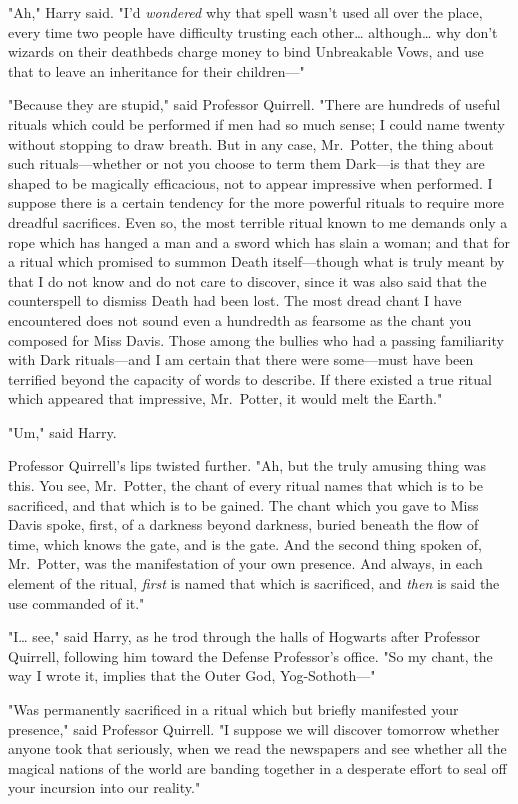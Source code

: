 "Ah," Harry said. "I'd \emph{wondered} why that spell wasn't used all over the
place, every time two people have difficulty trusting each other{\ldots}
although{\ldots} why don't wizards on their deathbeds charge money to bind
Unbreakable Vows, and use that to leave an inheritance for their children---"

"Because they are stupid," said Professor Quirrell. "There are hundreds of
useful rituals which could be performed if men had so much sense; I could name
twenty without stopping to draw breath. But in any case, Mr.~Potter, the thing
about such rituals---whether or not you choose to term them Dark---is that they
are shaped to be magically efficacious, not to appear impressive when
performed. I suppose there is a certain tendency for the more powerful rituals
to require more dreadful sacrifices. Even so, the most terrible ritual known to
me demands only a rope which has hanged a man and a sword which has slain a
woman; and that for a ritual which promised to summon Death itself---though
what is truly meant by that I do not know and do not care to discover, since it
was also said that the counterspell to dismiss Death had been lost. The most
dread chant I have encountered does not sound even a hundredth as fearsome as
the chant you composed for Miss Davis. Those among the bullies who had a
passing familiarity with Dark rituals---and I am certain that there were
some---must have been terrified beyond the capacity of words to describe. If
there existed a true ritual which appeared that impressive, Mr.~Potter, it
would melt the Earth."

"Um," said Harry.

Professor Quirrell's lips twisted further. "Ah, but the truly amusing thing was
this. You see, Mr.~Potter, the chant of every ritual names that which is to be
sacrificed, and that which is to be gained. The chant which you gave to Miss
Davis spoke, first, of a darkness beyond darkness, buried beneath the flow of
time, which knows the gate, and is the gate. And the second thing spoken of,
Mr.~Potter, was the manifestation of your own presence. And always, in each
element of the ritual, \emph{first} is named that which is sacrificed, and
\emph{then} is said the use commanded of it."

"I{\ldots} see," said Harry, as he trod through the halls of Hogwarts after
Professor Quirrell, following him toward the Defense Professor's office. "So my
chant, the way I wrote it, implies that the Outer God, Yog-Sothoth---"

"Was permanently sacrificed in a ritual which but briefly manifested your
presence," said Professor Quirrell. "I suppose we will discover tomorrow
whether anyone took that seriously, when we read the newspapers and see whether
all the magical nations of the world are banding together in a desperate effort
to seal off your incursion into our reality."

